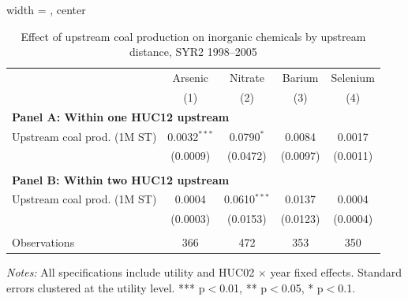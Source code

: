 \begin{table}[htbp]
   
   \caption{\label{tab:6yr_huc02fe_inorg_ravalli_2005_k2annprod} Effect of upstream coal production on inorganic chemicals by upstream distance, SYR2 1998--2005}
   \bigskip
   
   \centering
   
\begin{adjustbox}{width = \textwidth, center}
   \begin{tabular}{lcccc}
      \toprule
       & Arsenic & Nitrate & Barium & Selenium \\
                                  & (1)            & (2)          & (3)      & (4)\\  
      \midrule 
      \multicolumn{5}{l}{\textbf{Panel A: Within one HUC12 upstream}} \\
      Upstream coal prod. (1M ST) & 0.0032$^{***}$ & 0.0790$^{*}$ & 0.0084   & 0.0017\\   
                                  & (0.0009)       & (0.0472)     & (0.0097) & (0.0011)\\   
       \\
      \midrule 
      \multicolumn{5}{l}{\textbf{Panel B: Within two HUC12 upstream}} \\
      Upstream coal prod. (1M ST) & 0.0004   & 0.0610$^{***}$ & 0.0137   & 0.0004\\   
                                  & (0.0003) & (0.0153)       & (0.0123) & (0.0004)\\   
       \\
      Observations                & 366      & 472            & 353      & 350\\  
      \bottomrule
   \end{tabular}
\end{adjustbox}
   
   {\tiny\linespread{1}\selectfont \par \raggedright 
   \textit{Notes:} All specifications include utility and HUC02 $\times$ year fixed effects. Standard errors clustered at the utility level. *** p$<$0.01, ** p$<$0.05, * p$<$0.1.}
   
\end{table}


